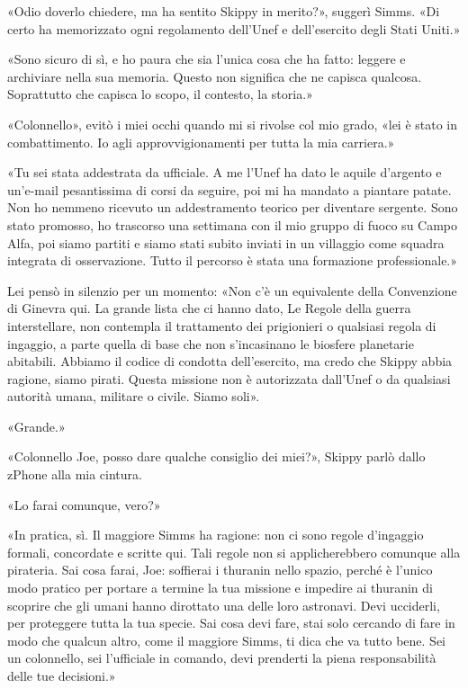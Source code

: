 «Odio doverlo chiedere, ma ha sentito Skippy in merito?», suggerì Simms.
«Di certo ha memorizzato ogni regolamento dell'Unef e dell'esercito
degli Stati Uniti.»

«Sono sicuro di sì, e ho paura che sia l'unica cosa che ha fatto:
leggere e archiviare nella sua memoria. Questo non significa che ne
capisca qualcosa. Soprattutto che capisca lo scopo, il contesto, la
storia.»

«Colonnello», evitò i miei occhi quando mi si rivolse col mio grado,
«lei è stato in combattimento. Io agli approvvigionamenti per tutta la
mia carriera.»

«Tu sei stata addestrata da ufficiale. A me l'Unef ha dato le aquile
d'argento e un'e-mail pesantissima di corsi da seguire, poi mi ha
mandato a piantare patate. Non ho nemmeno ricevuto un addestramento
teorico per diventare sergente. Sono stato promosso, ho trascorso una
settimana con il mio gruppo di fuoco su Campo Alfa, poi siamo partiti e
siamo stati subito inviati in un villaggio come squadra integrata di
osservazione. Tutto il percorso è stata una formazione professionale.»

Lei pensò in silenzio per un momento: «Non c'è un equivalente della
Convenzione di Ginevra qui. La grande lista che ci hanno dato, Le Regole
della guerra interstellare, non contempla il trattamento dei prigionieri
o qualsiasi regola di ingaggio, a parte quella di base che non
s'incasinano le biosfere planetarie abitabili. Abbiamo il codice di
condotta dell'esercito, ma credo che Skippy abbia ragione, siamo pirati.
Questa missione non è autorizzata dall'Unef o da qualsiasi autorità
umana, militare o civile. Siamo soli».

«Grande.»

«Colonnello Joe, posso dare qualche consiglio dei miei?», Skippy parlò
dallo zPhone alla mia cintura.

«Lo farai comunque, vero?»

«In pratica, sì. Il maggiore Simms ha ragione: non ci sono regole
d'ingaggio formali, concordate e scritte qui. Tali regole non si
applicherebbero comunque alla pirateria. Sai cosa farai, Joe: soffierai
i thuranin nello spazio, perché è l'unico modo pratico per portare a
termine la tua missione e impedire ai thuranin di scoprire che gli umani
hanno dirottato una delle loro astronavi. Devi ucciderli, per proteggere
tutta la tua specie. Sai cosa devi fare, stai solo cercando di fare in
modo che qualcun altro, come il maggiore Simms, ti dica che va tutto
bene. Sei un colonnello, sei l'ufficiale in comando, devi prenderti la
piena responsabilità delle tue decisioni.»

